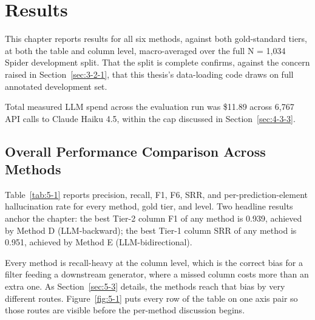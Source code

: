 \chapter{Results}\label{ch:5}

This chapter reports results for all six methods, against both gold-standard tiers, at both the table and column level, macro-averaged over the full N = 1,034 Spider development split. That the split is complete confirms, against the concern raised in Section~\ref{sec:3-2-1}, that this thesis's data-loading code draws on \citet{taniguchi2021} full annotated development set.

Total measured LLM spend across the evaluation run was \$11.89 across 6,767 API calls to Claude Haiku 4.5, within the cap discussed in Section~\ref{sec:4-3-3}.

\section{Overall Performance Comparison Across Methods}\label{sec:5-1}

Table~\ref{tab:5-1} reports precision, recall, F1, F6, SRR, and per-prediction-element hallucination rate for every method, gold tier, and level. Two headline results anchor the chapter: the best Tier-2 column F1 of any method is 0.939, achieved by Method D (LLM-backward); the best Tier-1 column SRR of any method is 0.951, achieved by Method E (LLM-bidirectional).

Every method is recall-heavy at the column level, which is the correct bias for a filter feeding a downstream generator, where a missed column costs more than an extra one. As Section~\ref{sec:5-3} details, the methods reach that bias by very different routes. Figure~\ref{fig:5-1} puts every row of the table on one axis pair so those routes are visible before the per-method discussion begins.

